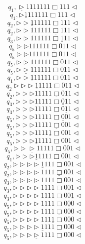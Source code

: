 \documentclass[12pt,a4paper]{article}
\theoremstyle{definition}
\begin{document}
\begin{enumerate}
\begin{enumerate}
			$$q_1,\underline{\triangleright} 1111111\Box111\triangleleft$$
			$$q_1,\triangleright\underline{1}111111\Box111\triangleleft$$
			$$q_2,\triangleright\triangleright\underline{1}11111\Box111\triangleleft$$
			$$q_2,\triangleright\triangleright111111\underline{\Box}111\triangleleft$$
			$$q_3,\triangleright\triangleright111111\Box\underline{1}11\triangleleft$$
			$$q_5\triangleright\triangleright111111\underline{\Box}011\triangleleft$$
			$$q_5\triangleright\triangleright11111\underline{1}\Box011\triangleleft$$
			$$q_5,\triangleright\triangleright\underline{1}11111\Box011\triangleleft$$
			$$q_5,\triangleright\underline{\triangleright}111111\Box011\triangleleft$$
			$$q_1,\triangleright\triangleright\underline{1}11111\Box011\triangleleft$$
			$$q_2\triangleright\triangleright\triangleright\underline{1}1111\Box011\triangleleft$$
			$$q_2,\triangleright\triangleright\triangleright11111\underline{\Box}011\triangleleft$$
			$$q_3,\triangleright\triangleright\triangleright11111\Box\underline{0}11\triangleleft$$
			$$q_3,\triangleright\triangleright\triangleright11111\Box0\underline{1}1\triangleleft$$
			$$q_5,\triangleright\triangleright\triangleright11111\Box\underline{0}01\triangleleft$$
			$$q_5,\triangleright\triangleright\triangleright11111\underline{\Box}001\triangleleft$$
			$$q_5,\triangleright\triangleright\triangleright1111\underline{1}\Box001\triangleleft$$
			$$q_5,\triangleright\triangleright\triangleright\underline{1}1111\Box001\triangleleft$$
			$$q_5,\triangleright\triangleright\underline{\triangleright}11111\Box001\triangleleft$$
			$$q_1,\triangleright\triangleright\triangleright\underline{1}1111\Box001\triangleleft$$
			$$q_2,\triangleright\triangleright\triangleright\triangleright\underline{1}111\Box001\triangleleft$$
			$$q_2,\triangleright\triangleright\triangleright\triangleright1111\underline{\Box}001\triangleleft$$
			$$q_3,\triangleright\triangleright\triangleright\triangleright1111\Box\underline{0}01\triangleleft$$
			$$q_3,\triangleright\triangleright\triangleright\triangleright1111\Box0\underline{0}1\triangleleft$$
			$$q_3,\triangleright\triangleright\triangleright\triangleright1111\Box00\underline{1}\triangleleft$$
			$$q_5,\triangleright\triangleright\triangleright\triangleright1111\Box0\underline{0}0\triangleleft$$
			$$q_5,\triangleright\triangleright\triangleright\triangleright1111\underline{\Box}000\triangleleft$$
			$$q_5,\triangleright\triangleright\triangleright\triangleright111\underline{1}\Box000\triangleleft$$
			$$q_5,\triangleright\triangleright\triangleright\triangleright\underline{1}111\Box000\triangleleft$$
			$$q_5,\triangleright\triangleright\triangleright\underline{\triangleright}1111\Box000\triangleleft$$

\end{enumerate}
\end{enumerate}
\end{document}
